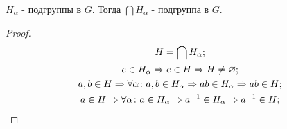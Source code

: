 \begin{theorem}{}
	$H_\alpha$ - подгруппы в $G$. Тогда $\bigcap H_\alpha$ - подгруппа в $G$.
\end{theorem}
\begin{proof}
    \begin{gather*}
	H = \bigcap H_\alpha; \\
	e \in H_{\alpha} \Rightarrow e \in H \Rightarrow H \ne \varnothing; \\
	a, b \in H \Rightarrow \forall \alpha\colon a, b \in H_\alpha \Rightarrow ab \in H_\alpha \Rightarrow ab \in H; \\
	a \in H \Rightarrow \forall \alpha \colon a \in H_\alpha \Rightarrow a^{-1} \in H_\alpha \Rightarrow a^{-1} \in H;
	\end{gather*}
\end{proof}

